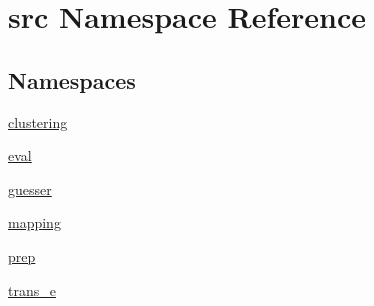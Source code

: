 \hypertarget{namespacesrc}{}\section{src Namespace Reference}
\label{namespacesrc}
\subsection*{Namespaces}
\begin{DoxyCompactItemize}
\item 
 \hyperlink{namespacesrc_1_1clustering}{clustering}
\item 
 \hyperlink{namespacesrc_1_1eval}{eval}
\item 
 \hyperlink{namespacesrc_1_1guesser}{guesser}
\item 
 \hyperlink{namespacesrc_1_1mapping}{mapping}
\item 
 \hyperlink{namespacesrc_1_1prep}{prep}
\item 
 \hyperlink{namespacesrc_1_1trans__e}{trans\+\_\+e}
\end{DoxyCompactItemize}
